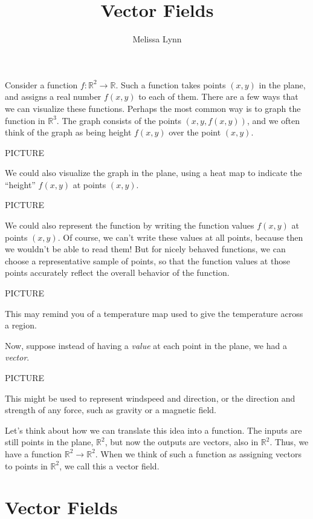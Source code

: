 \documentclass{ximera}
\title{Vector Fields}
\author{Melissa Lynn}
\begin{document}
\begin{abstract}
\end{abstract}
\maketitle

Consider a function $f:\mathbb{R}^2\rightarrow\mathbb{R}$. Such a function takes points $(x,y)$ in the plane, and assigns a real number $f(x,y)$ to each of them. There are a few ways that we can visualize these functions. Perhaps the most common way is to graph the function in $\mathbb{R}^3$. The graph consists of the points $(x,y,f(x,y))$, and we often think of the graph as being height $f(x,y)$ over the point $(x,y)$.

PICTURE

We could also visualize the graph in the plane, using a heat map to indicate the ``height'' $f(x,y)$ at points $(x,y)$.

PICTURE

We could also represent the function by writing the function values $f(x,y)$ at points $(x,y)$. Of course, we can't write these values at all points, because then we wouldn't be able to read them! But for nicely behaved functions, we can choose a representative sample of points, so that the function values at those points accurately reflect the overall behavior of the function.

PICTURE

This may remind you of a temperature map used to give the temperature across a region.

Now, suppose instead of having a \emph{value} at each point in the plane, we had a \emph{vector}.

PICTURE

This might be used to represent windspeed and direction, or the direction and strength of any force, such as gravity or a magnetic field.

Let's think about how we can translate this idea into a function. The inputs are still points in the plane, $\mathbb{R}^2$, but now the outputs are vectors, also in $\mathbb{R}^2$. Thus, we have a function $\mathbb{R}^2\rightarrow\mathbb{R}^2$. When we think of such a function as assigning vectors to points in $\mathbb{R}^2$, we call this a vector field.

\section*{Vector Fields}
\end{document}
